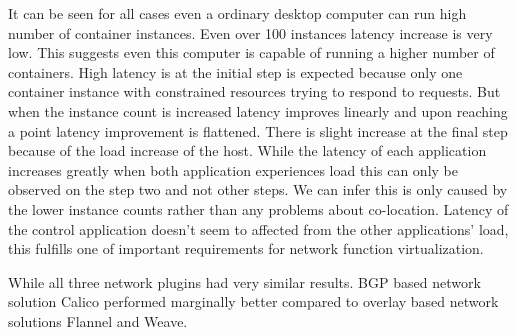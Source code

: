 \documentclass[12pt,oneandhalf,chaparabic,ceng,ms,eng,oneside,pntc]{gsufbe}
\begin{document}
It can be seen for all cases even a ordinary desktop computer can run high number of container
instances. Even over 100 instances latency increase is very low. This suggests even this computer is
capable of running a higher number of containers. High latency is at the initial step is expected 
because only one container instance with constrained resources trying to respond to requests. But when
the instance count is increased latency improves linearly and upon reaching a point latency improvement
is flattened. There is slight increase at the final step because of the load increase of the host.
While the latency of each application increases greatly when both application experiences load this can
only be observed on the step two and not other steps. We can infer this is only caused by the lower
instance counts rather than any problems about co-location. Latency of the control application doesn't
seem to affected from the other applications' load, this fulfills one of important requirements for
network function virtualization.

While all three network plugins had very similar results. BGP based network solution Calico performed
marginally better compared to overlay based network solutions Flannel and Weave. 
\end{document}
